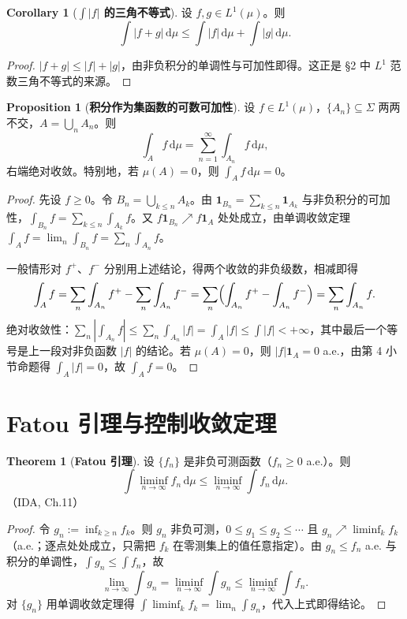 \documentclass[oneside]{book}
\theoremstyle{definition}
\newcommand{\dd}{\mathrm{d}}
\theoremstyle{definition}
\newtheorem{proposition}{Proposition}[section]
\newtheorem{theorem}{Theorem}[section]
\newtheorem{corollary}{Corollary}[section]
\begin{document}
	\begin{corollary}[\bfseries{$\int|f|$ 的三角不等式}]
		设 $f,g\in L^{1}(\mu)$。则
		\[
		\int|f+g|\,\dd\mu\leqslant\int|f|\,\dd\mu+\int|g|\,\dd\mu .
		\]
	\end{corollary}
	
	\begin{proof}
		$|f+g|\leqslant|f|+|g|$，由非负积分的单调性与可加性即得。这正是 \S2 中 $L^{1}$ 范数三角不等式的来源。
	\end{proof}
	
	\begin{proposition}[\bfseries{积分作为集函数的可数可加性}]
		设 $f\in L^{1}(\mu)$，$\{A_n\}\subseteq\Sigma$ 两两不交，$A=\bigcup_n A_n$。则
		\[
		\int_A f\,\dd\mu=\sum_{n=1}^{\infty}\int_{A_n}f\,\dd\mu ,
		\]
		右端绝对收敛。特别地，若 $\mu(A)=0$，则 $\int_A f\,\dd\mu=0$。
	\end{proposition}
	
	\begin{proof}
		先设 $f\geqslant0$。令 $B_n=\bigcup_{k\leqslant n}A_k$。由 $\mathbf{1}_{B_n}=\sum_{k\leqslant n}\mathbf{1}_{A_k}$ 与非负积分的可加性，$\int_{B_n}f=\sum_{k\leqslant n}\int_{A_k}f$。又 $f\mathbf{1}_{B_n}\nearrow f\mathbf{1}_A$ 处处成立，由单调收敛定理 $\int_A f=\lim_n\int_{B_n}f=\sum_{n}\int_{A_n}f$。
		
		一般情形对 $f^{+}$、$f^{-}$ 分别用上述结论，得两个收敛的非负级数，相减即得
		\[
		\int_A f=\sum_{n}\int_{A_n}f^{+}-\sum_{n}\int_{A_n}f^{-}=\sum_{n}\Bigl(\int_{A_n}f^{+}-\int_{A_n}f^{-}\Bigr)=\sum_{n}\int_{A_n}f .
		\]
		绝对收敛性：$\sum_n|\int_{A_n}f|\leqslant\sum_n\int_{A_n}|f|=\int_A|f|\leqslant\int|f|<+\infty$，其中最后一个等号是上一段对非负函数 $|f|$ 的结论。若 $\mu(A)=0$，则 $|f|\mathbf{1}_A=0$ a.e.，由第 4 小节命题得 $\int_A|f|=0$，故 $\int_A f=0$。
	\end{proof}
	
	\section{Fatou 引理与控制收敛定理}
	
	\begin{theorem}[\bfseries{Fatou 引理}]
		设 $\{f_n\}$ 是非负可测函数（$f_n\geqslant0$ a.e.）。则
		\[
		\int\liminf_{n\to\infty}f_n\,\dd\mu\leqslant\liminf_{n\to\infty}\int f_n\,\dd\mu .
		\]
		（IDA, Ch.11）
	\end{theorem}
	
	\begin{proof}
		令 $g_n:=\inf_{k\geqslant n}f_k$。则 $g_n$ 非负可测，$0\leqslant g_1\leqslant g_2\leqslant\cdots$ 且 $g_n\nearrow\liminf_k f_k$（a.e.；逐点处处成立，只需把 $f_k$ 在零测集上的值任意指定）。由 $g_n\leqslant f_n$ a.e. 与积分的单调性，$\int g_n\leqslant\int f_n$，故
		\[
		\lim_{n\to\infty}\int g_n=\liminf_{n\to\infty}\int g_n\leqslant\liminf_{n\to\infty}\int f_n .
		\]
		对 $\{g_n\}$ 用单调收敛定理得 $\int\liminf_k f_k=\lim_n\int g_n$，代入上式即得结论。
	\end{proof}
	
\end{document}
